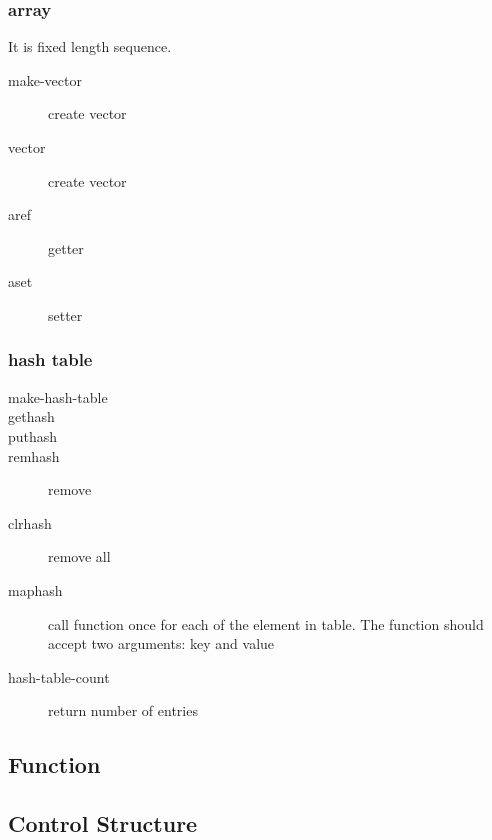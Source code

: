 \subsubsection{array}
It is fixed length sequence.
\begin{description}
\item [make-vector ] create vector
\item [vector ] create vector
\item [aref ] getter
\item [aset ] setter
\end{description}

\subsubsection{hash table}
\begin{description}
\item [make-hash-table]

\item [gethash ]
\item [puthash ]
\item [remhash ] remove
\item [clrhash ] remove all
\item [maphash ] call function once for each of the
  element in table. The function should accept two arguments: key and
  value
\item [hash-table-count ] return number of entries
\end{description}

\subsection{Function}

\subsection{Control Structure}

